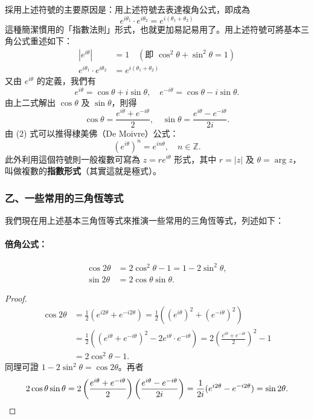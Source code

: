 採用上述符號的主要原因是：用上述符號去表達複角公式，即成為
\[
e^{i\theta_1}\cdot e^{i\theta_2} = e^{i(\theta_1+\theta_2)}
\]
這種簡潔慣用的「指數法則」形式，也就更加易記易用了。用上述符號可將基本三角公式重述如下：
\begin{align}
|e^{i\theta}| &= 1 \quad (\text{即 } \cos^2\theta+\sin^2\theta=1) \\
e^{i\theta_1}\cdot e^{i\theta_2} &= e^{i(\theta_1+\theta_2)}
\end{align}
又由 $e^{i\theta}$ 的定義，我們有
\[
e^{i\theta} = \cos\theta+i\sin\theta, \quad e^{-i\theta} = \cos\theta-i\sin\theta.
\]
由上二式解出 $\cos\theta$ 及 $\sin\theta$，則得
\[
\cos\theta = \frac{e^{i\theta}+e^{-i\theta}}{2}, \quad \sin\theta = \frac{e^{i\theta}-e^{-i\theta}}{2i}.
\]
由 (2) 式可以推得棣美佛（De Moivre）公式：
\[
(e^{i\theta})^n = e^{in\theta}, \quad n \in \mathbb{Z}.
\]
此外利用這個符號則一般複數可寫為 $z = re^{i\theta}$ 形式，其中 $r=|z|$ 及 $\theta=\arg z$，叫做複數的\textbf{指數形式}（其實這就是極式）。

\subsubsection*{乙、一些常用的三角恆等式}

我們現在用上述基本三角恆等式來推演一些常用的三角恆等式，列述如下：

\paragraph{倍角公式：}
\begin{align*}
\cos 2\theta &= 2\cos^2\theta-1 = 1-2\sin^2\theta, \\
\sin 2\theta &= 2\cos\theta\sin\theta.
\end{align*}
\begin{proof}
\begin{align*}
\cos 2\theta &= \frac{1}{2}(e^{i2\theta}+e^{-i2\theta}) = \frac{1}{2}((e^{i\theta})^2+(e^{-i\theta})^2) \\
&= \frac{1}{2}((e^{i\theta}+e^{-i\theta})^2-2e^{i\theta}\cdot e^{-i\theta}) = 2\left(\frac{e^{i\theta}+e^{-i\theta}}{2}\right)^2-1 \\
&= 2\cos^2\theta-1.
\end{align*}
同理可證 $1-2\sin^2\theta=\cos 2\theta$。再者
\[
2\cos\theta\sin\theta = 2\left(\frac{e^{i\theta}+e^{-i\theta}}{2}\right)\left(\frac{e^{i\theta}-e^{-i\theta}}{2i}\right) = \frac{1}{2i}(e^{i2\theta}-e^{-i2\theta}) = \sin 2\theta. \qedhere
\]
\end{proof}

